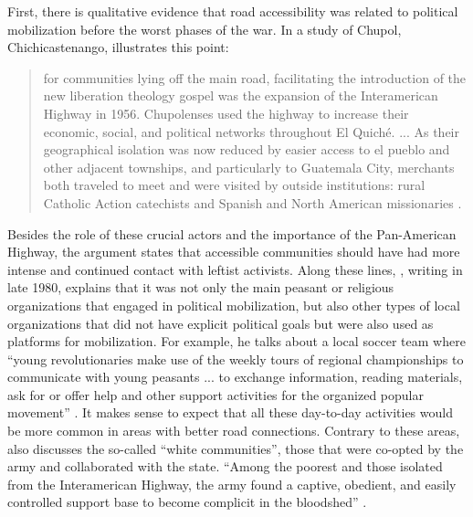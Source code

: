 \documentclass[12pt, notitlepage]{article}
\begin{document}

First, there is qualitative evidence that road accessibility was related to political mobilization before the worst phases of the war.
In a study of Chupol, Chichicastenango, \citet{Esparza:2018uw} illustrates this point:

\begin{quote}
  for communities lying off the main road, facilitating the introduction of the new liberation theology gospel was the expansion of the Interamerican Highway in 1956. Chupolenses used the highway to increase their economic, social, and political networks throughout El Quiché. ... As their geographical isolation was now reduced by easier access to el pueblo and other adjacent townships, and particularly to Guatemala City, merchants both traveled to meet and were visited by outside institutions: rural Catholic Action catechists and Spanish and North American missionaries \citep[93--94]{Esparza:2018uw}.
\end{quote}


Besides the role of these crucial actors and the importance of the Pan-American Highway, the argument states that accessible communities should have had more intense and continued contact with leftist activists.
Along these lines, \citet{Bran:1985tc}, writing in late 1980, explains that it was not only the main peasant or religious organizations that engaged in political mobilization, but also other types of local organizations that did not have explicit political goals but were also used as platforms for mobilization.
For example, he talks about a local soccer team where ``young revolutionaries make use of the weekly tours of regional championships to communicate with young peasants ... to exchange information, reading materials, ask for or offer help and other support activities for the organized popular movement'' \citep[15]{Bran:1985tc}.
It makes sense to expect that all these day-to-day activities would be more common in areas with better road connections.
Contrary to these areas, \citet{Esparza:2018uw} also discusses the so-called ``white communities'', those that were co-opted by the army and collaborated with the state.
``Among the poorest and those isolated from the Interamerican Highway, the army found a captive, obedient, and easily controlled support base to become complicit in the bloodshed'' \citet[138]{Esparza:2018uw}.
\end{document}
